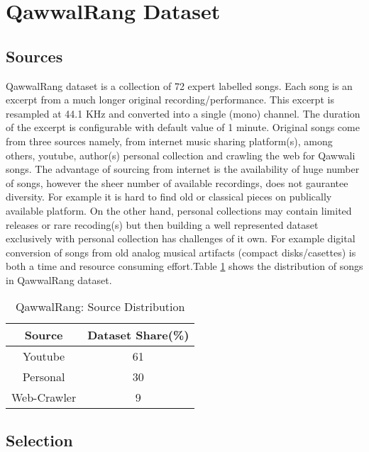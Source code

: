 \documentclass{article}
\begin{document}
\section{QawwalRang Dataset}\label{sec:data}

\subsection{Sources}

QawwalRang dataset is a collection of 72 expert labelled songs. Each song is an excerpt from a much longer original recording/performance. This excerpt is resampled at 44.1 KHz and converted into a single (mono) channel. The duration of the excerpt is configurable with default value of 1 minute. Original songs come from three sources namely, from internet music sharing platform(s), among others, youtube, author(s) personal collection and crawling the web for Qawwali songs. The advantage of sourcing from internet is the availability of huge number of songs, however the sheer number of available recordings, does not gaurantee diversity.  For example it is hard to find old or classical pieces on publically available platform. On the other hand, personal collections may contain limited releases or rare recoding(s) but then building a well represented dataset exclusively with personal collection has challenges of it own. For example digital conversion of songs from old analog musical artifacts (compact disks/casettes) is both a time and resource consuming effort.Table 
\ref{tab:sources} shows the distribution of songs in QawwalRang dataset.
\begin{table}[htpb]
\centering
  \begin{tabular}{|c | c|}
  \toprule
  \bfseries Source & \bfseries Dataset Share(\%) \\
  \hline \hline
  Youtube  & 61 \\
  \hline
  Personal & 30 \\
  \hline
  Web-Crawler & 9  \\
  \bottomrule
  \end{tabular}
  \caption{QawwalRang: Source Distribution}
\label{tab:sources}
\end{table}
\subsection{Selection}
\end{document}
